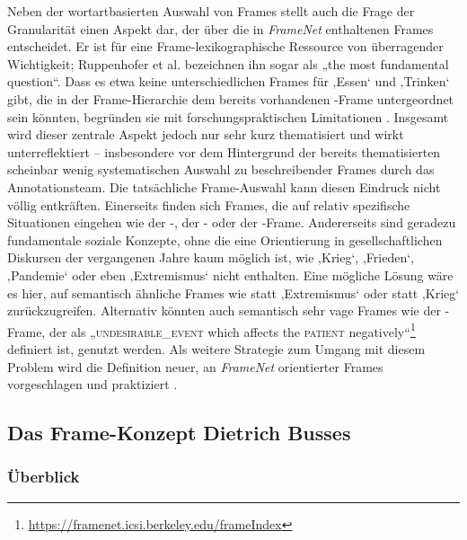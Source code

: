 Neben der wortartbasierten Auswahl von Frames stellt auch die Frage der Granularität einen Aspekt dar, der über die in \emph{FrameNet} enthaltenen Frames entscheidet. Er ist für eine Frame-lexikographische Ressource von überragender Wichtigkeit; Ruppenhofer et al. \autocite*[17]{ruppenhoferFrameNetIIExtended2016} bezeichnen ihn sogar als „the most fundamental question``. Dass es etwa keine unterschiedlichen Frames für ‚Essen` und ‚Trinken` gibt, die in der Frame-Hierarchie dem bereits vorhandenen -Frame untergeordnet sein könnten, begründen sie mit forschungspraktischen Limitationen \autocite[17]{ruppenhoferFrameNetIIExtended2016}. Insgesamt wird dieser zentrale Aspekt jedoch nur sehr kurz thematisiert und wirkt unterreflektiert -- insbesondere vor dem Hintergrund der bereits thematisierten scheinbar wenig systematischen Auswahl zu beschreibender Frames durch das Annotationsteam. Die tatsächliche Frame-Auswahl kann diesen Eindruck nicht völlig entkräften. Einerseits finden sich Frames, die auf relativ spezifische Situationen eingehen wie der -, der - oder der -Frame. Andererseits sind geradezu fundamentale soziale Konzepte, ohne die eine Orientierung in gesellschaftlichen Diskursen der vergangenen Jahre kaum möglich ist, wie ‚Krieg`, ‚Frieden`, ‚Pandemie` oder eben ‚Extremismus` nicht enthalten. Eine mögliche Lösung wäre es hier, auf semantisch ähnliche Frames wie  statt ‚Extremismus` oder  statt ‚Krieg` zurückzugreifen. Alternativ könnten auch semantisch sehr vage Frames wie der -Frame, der als „\textsc{undesirable\_event} which affects the \textsc{patient} negatively``\footnote{\url{https://framenet.icsi.berkeley.edu/frameIndex}} definiert ist, genutzt werden. Als weitere Strategie zum Umgang mit diesem Problem wird die Definition neuer, an \emph{FrameNet} orientierter Frames vorgeschlagen und praktiziert \autocites[etwa bei][]{scholzVokabularImDiskurshistorischen2015, dutraBuildingFrameSemanticModel2023, bisiadaMeTooDreiSprachen2023}.

\subsection{Das Frame-Konzept Dietrich Busses}\label{das-frame-konzept-dietrich-busses}

\subsubsection{Überblick}\label{ueberblick}

